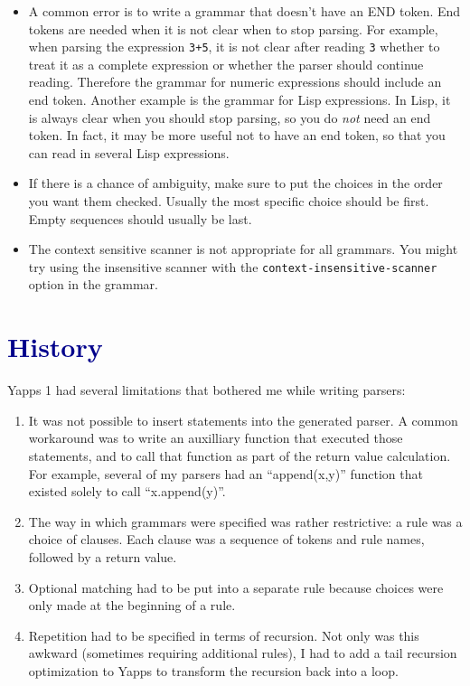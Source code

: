 \documentclass[10pt]{article}
\newcommand{\mysection}[1]{\section{\textcolor{darkblue}{#1}}}
\begin{document}
\begin{itemize}
 \item A common error is to write a grammar that doesn't have an END
   token.  End tokens are needed when it is not clear when to stop
   parsing.  For example, when parsing the expression {\tt 3+5}, it is 
   not clear after reading {\tt 3} whether to treat it as a complete
   expression or whether the parser should continue reading.
   Therefore the grammar for numeric expressions should include an end 
   token.  Another example is the grammar for Lisp expressions.  In
   Lisp, it is always clear when you should stop parsing, so you do
   \emph{not} need an end token.  In fact, it may be more useful not
   to have an end token, so that you can read in several Lisp expressions.
 \item If there is a chance of ambiguity, make sure to put the choices 
   in the order you want them checked.  Usually the most specific
   choice should be first.  Empty sequences should usually be last.
 \item The context sensitive scanner is not appropriate for all
   grammars.  You might try using the insensitive scanner with the
   {\tt context-insensitive-scanner} option in the grammar.
\end{itemize}

\mysection{History}

Yapps 1 had several limitations that bothered me while writing
parsers:

\begin{enumerate}
 \item It was not possible to insert statements into the generated
   parser.  A common workaround was to write an auxilliary function
   that executed those statements, and to call that function as part
   of the return value calculation.  For example, several of my
   parsers had an ``append(x,y)'' function that existed solely to call 
   ``x.append(y)''.
 \item The way in which grammars were specified was rather
   restrictive: a rule was a choice of clauses.  Each clause was a
   sequence of tokens and rule names, followed by a return value.
 \item Optional matching had to be put into a separate rule because
   choices were only made at the beginning of a rule.
 \item Repetition had to be specified in terms of recursion.  Not only 
   was this awkward (sometimes requiring additional rules), I had to
   add a tail recursion optimization to Yapps to transform the
   recursion back into a loop.
\end{enumerate}
\end{document}
